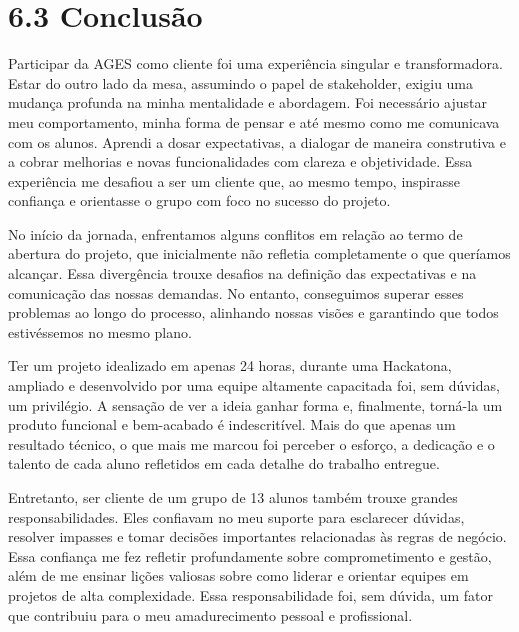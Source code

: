 
\section*{6.3 Conclusão}
\label{cliente-hoortech:text-h-0038}

\originaltab{}Participar da AGES como cliente foi uma experiência singular e transformadora. Estar do outro lado da mesa, assumindo o papel de stakeholder, exigiu uma mudança profunda na minha mentalidade e abordagem. Foi necessário ajustar meu comportamento, minha forma de pensar e até mesmo como me comunicava com os alunos. Aprendi a dosar expectativas, a dialogar de maneira construtiva e a cobrar melhorias e novas funcionalidades com clareza e objetividade. Essa experiência me desafiou a ser um cliente que, ao mesmo tempo, inspirasse confiança e orientasse o grupo com foco no sucesso do projeto.\par

\originaltab{}No início da jornada, enfrentamos alguns conflitos em relação ao termo de abertura do projeto, que inicialmente não refletia completamente o que queríamos alcançar. Essa divergência trouxe desafios na definição das expectativas e na comunicação das nossas demandas. No entanto, conseguimos superar esses problemas ao longo do processo, alinhando nossas visões e garantindo que todos estivéssemos no mesmo plano.\par

Ter um projeto idealizado em apenas 24 horas, durante uma Hackatona, ampliado e desenvolvido por uma equipe altamente capacitada foi, sem dúvidas, um privilégio. A sensação de ver a ideia ganhar forma e, finalmente, torná-la um produto funcional e bem-acabado é indescritível. Mais do que apenas um resultado técnico, o que mais me marcou foi perceber o esforço, a dedicação e o talento de cada aluno refletidos em cada detalhe do trabalho entregue.\par

Entretanto, ser cliente de um grupo de 13 alunos também trouxe grandes responsabilidades. Eles confiavam no meu suporte para esclarecer dúvidas, resolver impasses e tomar decisões importantes relacionadas às regras de negócio. Essa confiança me fez refletir profundamente sobre comprometimento e gestão, além de me ensinar lições valiosas sobre como liderar e orientar equipes em projetos de alta complexidade. Essa responsabilidade foi, sem dúvida, um fator que contribuiu para o meu amadurecimento pessoal e profissional.\par

